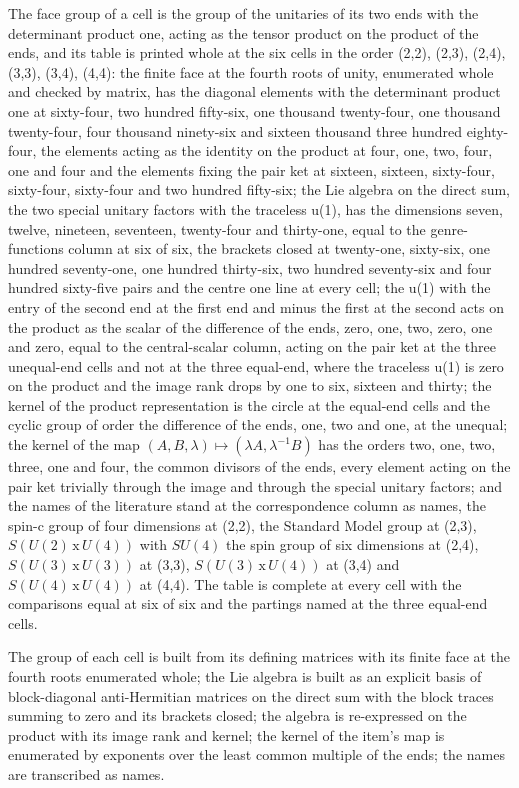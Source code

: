 \begin{chtable}
The face group of a cell is the group of the unitaries of its two ends with the determinant product one, acting as the tensor product on the product of the ends, and its table is printed whole at the six cells in the order (2,2), (2,3), (2,4), (3,3), (3,4), (4,4): the finite face at the fourth roots of unity, enumerated whole and checked by matrix, has the diagonal elements with the determinant product one at sixty-four, two hundred fifty-six, one thousand twenty-four, one thousand twenty-four, four thousand ninety-six and sixteen thousand three hundred eighty-four, the elements acting as the identity on the product at four, one, two, four, one and four and the elements fixing the pair ket at sixteen, sixteen, sixty-four, sixty-four, sixty-four and two hundred fifty-six; the Lie algebra on the direct sum, the two special unitary factors with the traceless u(1), has the dimensions seven, twelve, nineteen, seventeen, twenty-four and thirty-one, equal to the genre-functions column at six of six, the brackets closed at twenty-one, sixty-six, one hundred seventy-one, one hundred thirty-six, two hundred seventy-six and four hundred sixty-five pairs and the centre one line at every cell; the u(1) with the entry of the second end at the first end and minus the first at the second acts on the product as the scalar of the difference of the ends, zero, one, two, zero, one and zero, equal to the central-scalar column, acting on the pair ket at the three unequal-end cells and not at the three equal-end, where the traceless u(1) is zero on the product and the image rank drops by one to six, sixteen and thirty; the kernel of the product representation is the circle at the equal-end cells and the cyclic group of order the difference of the ends, one, two and one, at the unequal; the kernel of the map $(A, B, \lambda) \mapsto (\lambda A, \lambda^{-1} B)$ has the orders two, one, two, three, one and four, the common divisors of the ends, every element acting on the pair ket trivially through the image and through the special unitary factors; and the names of the literature stand at the correspondence column as names, the spin-c group of four dimensions at (2,2), the Standard Model group at (2,3), $S(U(2) \,\mathrm{x}\, U(4))$ with $SU(4)$ the spin group of six dimensions at (2,4), $S(U(3) \,\mathrm{x}\, U(3))$ at (3,3), $S(U(3) \,\mathrm{x}\, U(4))$ at (3,4) and $S(U(4) \,\mathrm{x}\, U(4))$ at (4,4). The table is complete at every cell with the comparisons equal at six of six and the partings named at the three equal-end cells.
\end{chtable}
\chdeps{}{}
The group of each cell is built from its defining matrices with its finite face at the fourth roots enumerated whole; the Lie algebra is built as an explicit basis of block-diagonal anti-Hermitian matrices on the direct sum with the block traces summing to zero and its brackets closed; the algebra is re-expressed on the product with its image rank and kernel; the kernel of the item's map is enumerated by exponents over the least common multiple of the ends; the names are transcribed as names.


